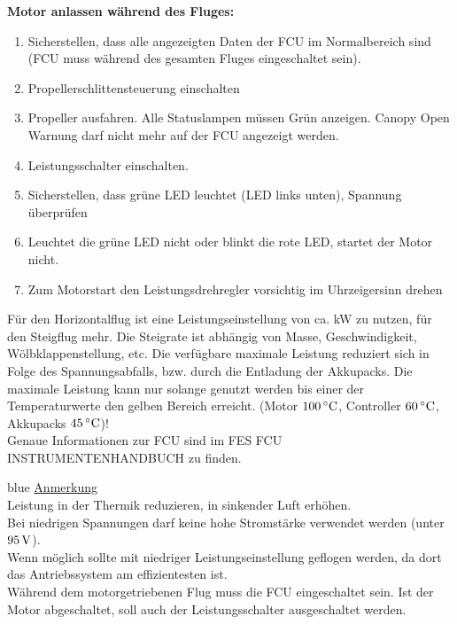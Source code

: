 \textbf{Motor anlassen während des Fluges:}
\begin{enumerate}
\item Sicherstellen, dass alle angezeigten Daten der FCU im Normalbereich sind (FCU muss während des gesamten Fluges eingeschaltet sein).
\item Propellerschlittensteuerung einschalten
\item Propeller ausfahren. Alle Statuslampen müssen Grün anzeigen. Canopy Open Warnung darf nicht mehr auf der FCU angezeigt werden.
\item Leistungsschalter einschalten.
\item Sicherstellen, dass grüne LED leuchtet (LED links unten), Spannung überprüfen
\item Leuchtet die grüne LED nicht oder blinkt die rote LED, startet der Motor nicht. 
\item Zum Motorstart den Leistungsdrehregler vorsichtig im Uhrzeigersinn drehen
\end{enumerate}

Für den Horizontalflug ist eine Leistungseinstellung von ca.
\unit[8]{kW} zu nutzen, für den
Steigflug mehr. Die Steigrate ist abhängig von Masse, Geschwindigkeit, Wölbklappenstellung, etc.
Die verfügbare maximale Leistung reduziert sich in Folge des Spannungsabfalls, bzw.
durch die Entladung der Akkupacks. Die maximale Leistung kann nur solange genutzt werden bis einer der Temperaturwerte den gelben Bereich erreicht. (Motor $\unit[100]{^\circ C}$, Controller $\unit[60]{^\circ C}$, Akkupacks $\unit[45]{^\circ C}$)!\\

Genaue Informationen zur FCU sind im FES FCU INSTRUMENTENHANDBUCH zu finden.\\

\begin{color}{blue}
\large{\underline{Anmerkung}}\\
Leistung in der Thermik reduzieren, in sinkender Luft erhöhen.\\
Bei niedrigen Spannungen darf keine hohe Stromstärke verwendet werden (unter
$\unit[95]{V}$).\\
Wenn möglich sollte mit niedriger Leistungseinstellung geflogen werden, da dort das
Antriebssystem am effizientesten ist.\\
Während dem motorgetriebenen Flug muss die FCU eingeschaltet sein. Ist der Motor
abgeschaltet, soll auch der Leistungsschalter ausgeschaltet werden.
\end{color}

